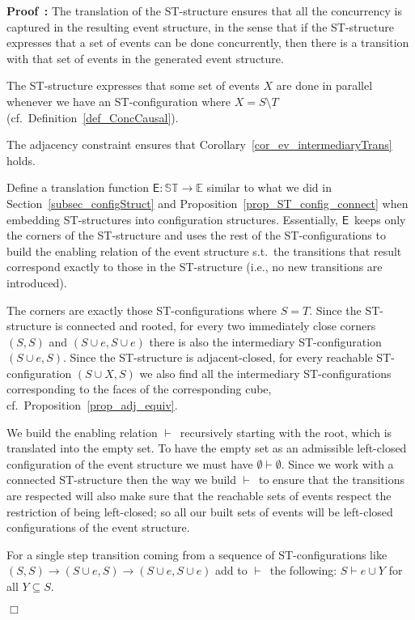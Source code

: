 \documentclass[submission,copyright,creativecommons]{eptcs}
\newenvironment{proof}[1][\!\!\,]{\vspace{1ex}\noindent\textbf{Proof #1: }}{\hfill$\Box$\vspace{2ex}}
\newcommand\allST{\ensuremath{\mathbb{ST}}}
\newcommand\allEv{\ensuremath{\mathbb{E}}}
\newcommand\enableRelEv{\ensuremath{\vdash}}
\newcommand\stintoe{\ensuremath{\mathsf{E}}}
\newcommand{\transition}[1]{\ensuremath{\xrightarrow{#1}}}
\begin{document}
\begin{proof}
The translation of the ST-structure ensures that all the concurrency is captured in the resulting event structure, in the sense that if the ST-structure expresses that a set of events can be done concurrently, then there is a transition with that set of events in the generated event structure.

The ST-structure expresses that some set of events $X$ are done in parallel whenever we have an ST-configuration where $X=S\setminus T$ (cf.\ Definition~\ref{def_ConcCausal}).

The adjacency constraint ensures that Corollary~\ref{cor_ev_intermediaryTrans} holds.

Define a translation function $\stintoe:\allST\rightarrow\allEv$ similar to what we did in Section~\ref{subsec_configStruct} and Proposition~\ref{prop_ST_config_connect} when embedding ST-structures into configuration structures. Essentially, \stintoe\ keeps only the corners of the ST-structure and uses the rest of the ST-configurations to build the enabling relation of the event structure s.t.\ the transitions that result correspond exactly to those in the ST-structure (i.e., no new transitions are introduced). 

The corners are exactly those ST-configurations where $S=T$.
Since the ST-structure is connected and rooted, for every two immediately close corners $(S,S)$ and $(S\cup e,S\cup e)$ there is also the intermediary ST-configuration $(S\cup e,S)$. Since the ST-structure is adjacent-closed, for every reachable ST-configuration $(S\cup X,S)$ we also find all the intermediary ST-configurations corresponding to the faces of the corresponding cube, cf.~Proposition~\ref{prop_adj_equiv}.

We build the enabling relation \enableRelEv\ recursively starting with the root, which is translated into the empty set. To have the empty set as an admissible left-closed configuration of the event structure we must have $\emptyset\enableRelEv\emptyset$. Since we work with a connected ST-structure then the way we build \enableRelEv\ to ensure that the transitions are respected will also make sure that the reachable sets of events respect the restriction of being left-closed; so all our built sets of events will be left-closed configurations of the event structure.

For a single step transition coming from a sequence of ST-configurations like  $(S,S)\transition{}(S\cup e,S)\transition{}(S\cup e,S\cup e)$ add to \enableRelEv\ the following: $S\enableRelEv e\cup Y$ for all $Y\subseteq S$.


\end{proof}
\end{document}
